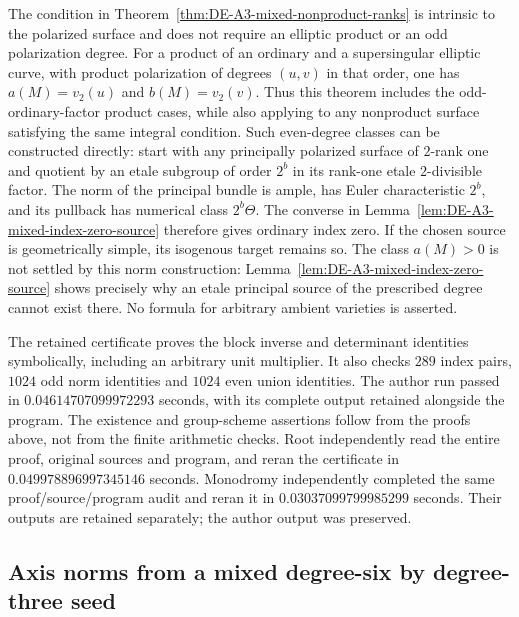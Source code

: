 \begin{remark}
\label{rem:DE-A3-mixed-nonproduct-scope}
The condition in Theorem~\ref{thm:DE-A3-mixed-nonproduct-ranks}
is intrinsic to the polarized surface and does not require an
elliptic product or an odd polarization degree.
For a product of an ordinary and a supersingular elliptic curve,
with product polarization of degrees $(u,v)$ in that order,
one has $a(M)=v_2(u)$ and $b(M)=v_2(v)$.
Thus this theorem includes the odd-ordinary-factor product cases,
while also applying to any nonproduct surface satisfying the
same integral condition.
Such even-degree classes can be constructed directly: start with
any principally polarized surface of $2$-rank one and quotient by
an etale subgroup of order $2^b$ in its rank-one etale
$2$-divisible factor.  The norm of the principal bundle is ample,
has Euler characteristic $2^b$, and its pullback has numerical
class $2^b\Theta$.  The converse in
Lemma~\ref{lem:DE-A3-mixed-index-zero-source} therefore gives
ordinary index zero.  If the chosen source is geometrically simple,
its isogenous target remains so.
The class $a(M)>0$ is not settled by this norm construction:
Lemma~\ref{lem:DE-A3-mixed-index-zero-source} shows precisely why
an etale principal source of the prescribed degree cannot exist
there.  No formula for arbitrary ambient varieties is asserted.

The retained certificate
proves the block inverse and determinant identities symbolically,
including an arbitrary unit multiplier.  It also checks $289$
index pairs, $1024$ odd norm identities and $1024$ even union identities.
The author run passed in $0.04614707099972293$ seconds, with its
complete output retained alongside the program.  The existence and
group-scheme assertions follow from the proofs above, not from the
finite arithmetic checks.
Root independently read the entire proof, original sources and program,
and reran the certificate in $0.049978896997345146$ seconds.
Monodromy independently completed the same proof/source/program audit
and reran it in $0.03037099799985299$ seconds.  Their outputs are retained
separately; the author output was preserved.
\end{remark}




\subsection{Axis norms from a mixed degree-six by degree-three seed}
\label{sec:DE-A3-mixed-axis-norms}

